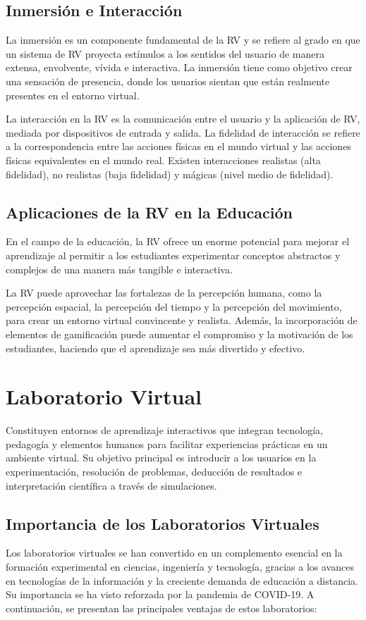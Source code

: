 \subsection{Inmersión e Interacción}
La inmersión es un componente fundamental de la RV y se refiere al grado en que un sistema de RV proyecta estímulos a los sentidos del usuario de manera extensa, envolvente, vívida e interactiva. La inmersión tiene como objetivo crear una sensación de presencia, donde los usuarios sientan que están realmente presentes en el entorno virtual.

La interacción en la RV es la comunicación entre el usuario y la aplicación de RV, mediada por dispositivos de entrada y salida. La fidelidad de interacción se refiere a la correspondencia entre las acciones físicas en el mundo virtual y las acciones físicas equivalentes en el mundo real. Existen interacciones realistas (alta fidelidad), no realistas (baja fidelidad) y mágicas (nivel medio de fidelidad).
\subsection{Aplicaciones de la RV en la Educación}
En el campo de la educación, la RV ofrece un enorme potencial para mejorar el aprendizaje al permitir a los estudiantes experimentar conceptos abstractos y complejos de una manera más tangible e interactiva.

La RV puede aprovechar las fortalezas de la percepción humana, como la percepción espacial, la percepción del tiempo y la percepción del movimiento, para crear un entorno virtual convincente y realista. Además, la incorporación de elementos de gamificación puede aumentar el compromiso y la motivación de los estudiantes, haciendo que el aprendizaje sea más divertido y efectivo.

\section{Laboratorio Virtual}
Constituyen entornos de aprendizaje interactivos que integran tecnología, pedagogía y elementos humanos para facilitar experiencias prácticas en un ambiente virtual. Su objetivo principal es introducir a los usuarios en la experimentación, resolución de problemas, deducción de resultados e interpretación científica a través de simulaciones.

\subsection{Importancia de los Laboratorios Virtuales}
Los laboratorios virtuales se han convertido en un complemento esencial en la formación experimental en ciencias, ingeniería y tecnología, gracias a los avances en tecnologías de la información y la creciente demanda de educación a distancia. Su importancia se ha visto reforzada por la pandemia de COVID-19. A continuación, se presentan las principales ventajas de estos laboratorios\cite{Importancia_de_los_laboratorios_virtuales}:

